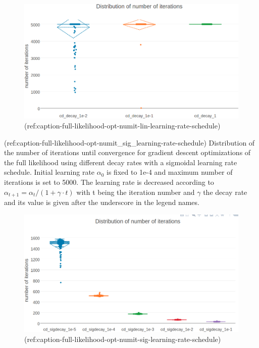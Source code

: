 \documentclass[12pt,a4paper,twoside]{book}
\theoremstyle{definition}
\theoremstyle{definition}
\theoremstyle{remark}
\begin{document}
\begin{figure}

{\centering \includegraphics[width=0.9\linewidth]{img/full_likelihood/appendix/distribution_numiterations_against_alpha1e-4_lindecay} 

}

\caption{(ref:caption-full-likelihood-opt-numit-lin-learning-rate-schedule)}\label{fig:full-likelihood-opt-numit-lin-learning-rate-schedule}
\end{figure}

(ref:caption-full-likelihood-opt-numit\_sig\_learning-rate-schedule)
Distribution of the number of iterations until convergence for gradient
descent optimizations of the full likelihood using different decay rates
with a sigmoidal learning rate schedule. Initial learning rate
\(\alpha_0\) is fixed to 1e-4 and maximum number of iterations is set to
5000. The learning rate is decreased according to
\(\alpha_{t+1} = \alpha_{t} / (1 + \gamma \cdot t)\) with t being the
iteration number and \(\gamma\) the decay rate and its value is given
after the underscore in the legend names.

\begin{figure}

{\centering \includegraphics[width=0.9\linewidth]{img/full_likelihood/appendix/distribution_numiterations_against_alpha1e-4_sigdecay} 

}

\caption{(ref:caption-full-likelihood-opt-numit-sig-learning-rate-schedule)}\label{fig:full-likelihood-opt-numit-sig-learning-rate-schedule}
\end{figure}
\end{document}
